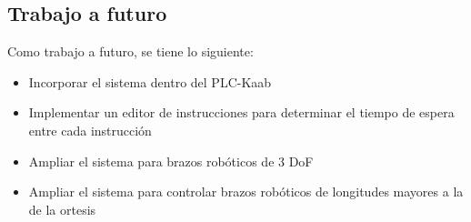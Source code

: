 \subsection{Trabajo a futuro}

Como trabajo a futuro, se tiene lo siguiente:

\begin{itemize}
	\item Incorporar el sistema dentro del PLC-Kaab
	\item Implementar un editor de instrucciones para determinar el tiempo de espera entre cada instrucción
	\item Ampliar el sistema para brazos robóticos de 3 DoF
	\item Ampliar el sistema para controlar brazos robóticos de longitudes mayores a la de la ortesis
\end{itemize}